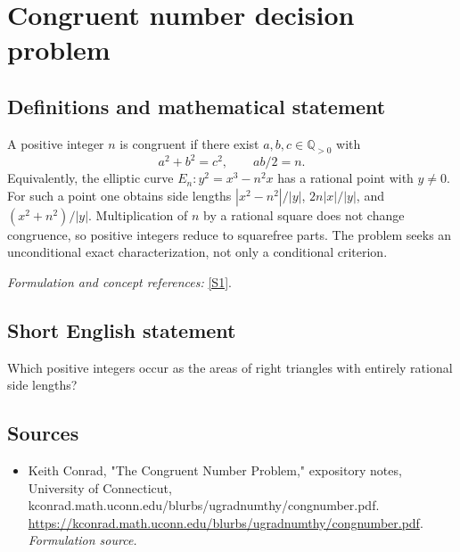\documentclass[11pt]{article}
\begin{document}
\section*{\texorpdfstring{Congruent number decision problem}{Congruent number decision problem}}\label{8900008}
\subsection{Definitions and mathematical statement}
A positive integer $n$ is congruent if there exist $a,b,c\in{\mathbb{Q}}_{>0}$ with
\[
 a^2+b^2=c^2,\qquad ab/2=n.
\]
Equivalently, the elliptic curve $E_n:y^2=x^3-n^2x$ has a rational point with $y\ne0$. For such a point one obtains side lengths $|x^2-n^2|/|y|$, $2n|x|/|y|$, and $(x^2+n^2)/|y|$. Multiplication of $n$ by a rational square does not change congruence, so positive integers reduce to squarefree parts. The problem seeks an unconditional exact characterization, not only a conditional criterion.
\par\smallskip\textit{Formulation and concept references:} \href{https://kconrad.math.uconn.edu/blurbs/ugradnumthy/congnumber.pdf}{[S1]}.

\subsection{Short English statement}
Which positive integers occur as the areas of right triangles with entirely rational side lengths?
\subsection{Sources}
\begin{itemize}
\item[S1]Keith Conrad, "The Congruent Number Problem," expository notes, University of Connecticut, kconrad.math.uconn.edu/blurbs/ugradnumthy/congnumber.pdf.
\url{https://kconrad.math.uconn.edu/blurbs/ugradnumthy/congnumber.pdf}.
\textit{Formulation source.}
\end{itemize}
\end{document}
